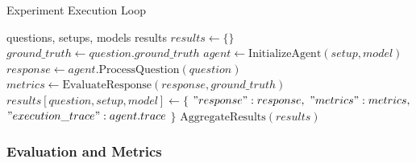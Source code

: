             
                \begin{algorithm}
                    \caption{Experiment Execution Loop}
                    \begin{algorithmic}[1]
                    \Require questions, setups, models
                    \Ensure results                    
                        \State $results \gets \{\}$     
                            \State $ground\_truth \gets question.ground\_truth$                            
                                    \State $agent \gets \text{InitializeAgent}(setup, model)$
                                    \State $response \gets agent.\text{ProcessQuestion}(question)$                                    
                                    \State $metrics \gets \text{EvaluateResponse}(response, ground\_truth)$                                    
                                    \State $results[question, setup, model] \gets \{$
                                    \State \hspace{1cm} $"response": response,$
                                    \State \hspace{1cm} $"metrics": metrics,$
                                    \State \hspace{1cm} $"execution\_trace": agent.trace$
                                    \State $\}$
                                \EndFor
                            \EndFor
                        \EndFor
                        \State \Return $\text{AggregateResults}(results)$
                    \EndFunction                    
                    \end{algorithmic}
                    \label{alg:execution_loop}
                \end{algorithm}
            
            \subsubsection{Evaluation and Metrics}

